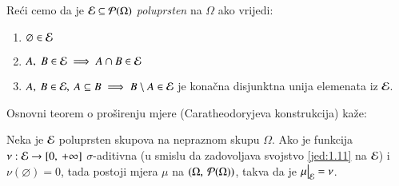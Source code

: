Re\' ci cemo da je $\mathcal{E} \subseteq \mathcal{P}({\Omega})$ \emph{poluprsten}
na $\Omega$ ako vrijedi:
\begin{enumerate}[label=(\roman*)]
    \item $\varnothing \in \mathcal{E}$
    \item $A, \; B \in \mathcal{E} \implies A \cap B \in \mathcal{E}$
    \item $A, \: B \in \mathcal{E}, \: A \subseteq B \implies B \setminus
        A \in \mathcal{E}$ je kona\v cna disjunktna unija elemenata iz $\mathcal{E}$.
\end{enumerate}

Osnovni teorem o pro\v sirenju mjere (Caratheodoryjeva konstrukcija) ka\v ze:

\begin{tm}  \label{tm:2.11}
    Neka je $\mathcal{E}$ poluprsten skupova na nepraznom skupu $\Omega$. Ako je funkcija $\nu: \mathcal{E} \to [0, \: + \infty]$ $\sigma$-aditivna (u smislu da zadovoljava svojstvo \eqref{jed:1.11} na $\mathcal{E}$) i $\nu(\varnothing) = 0$, tada postoji mjera $\mu$ na $(\Omega, \: \mathcal{P}({\Omega}))$, takva da je $\restr{\mu}{\famE} = \nu$.
\end{tm}

